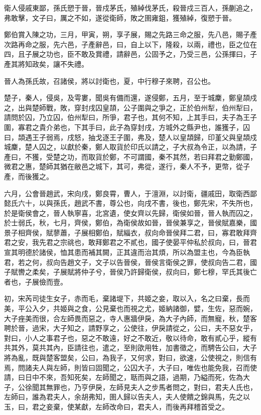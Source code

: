 \begin{pinyinscope}
衛人侵戚東鄙，孫氏愬于晉，晉戍茅氏，殖綽伐茅氏，殺晉戍三百人，孫蒯追之，弗敢擊，文子曰，厲之不如，遂從衛師，敗之圉雍鉏，獲殖綽，復愬于晉。

鄭伯賞入陳之功，三月，甲寅，朔，享子展，賜之先路三命之服，先八邑，賜子產次路再命之服，先六邑，子產辭邑，曰，自上以下，隆殺，以兩，禮也，臣之位在四，且子展之功也，臣不敢及賞禮，請辭邑，公固予之，乃受三邑，公孫揮曰，子產其將知政矣，讓不失禮。

晉人為孫氏故，召諸侯，將以討衛也，夏，中行穆子來聘，召公也。

楚子，秦人，侵吳，及雩婁，聞吳有備而還，遂侵鄭，五月，至于城麇，鄭皇頡戍之，出與楚師戰，敗，穿封戌囚皇頡，公子圍與之爭之，正於伯州犁，伯州犁曰，請問於囚，乃立囚，伯州犁曰，所爭，君子也，其何不知，上其手曰，夫子為王子圍，寡君之貴介弟也，下其手曰，此子為穿封戌，方城外之縣尹也，誰獲子，囚曰，頡遇王子弱焉，戌怒，抽戈逐王子圍，弗及，楚人以皇頡歸，印堇父與皇頡戍城麇，楚人囚之，以獻於秦，鄭人取貨於印氏以請之，子大叔為令正，以為請，子產曰，不獲，受楚之功，而取貨於鄭，不可謂國，秦不其然，若曰拜君之勤鄭國，微君之惠，楚師其猶在敝邑之城下，其可，弗從，遂行，秦人不予，更幣，從子產，而後獲之。

六月，公會晉趙武，宋向戌，鄭良霄，曹人，于澶淵，以討衛，疆戚田，取衛西鄙懿氏六十，以與孫氏，趙武不書，尊公也，向戌不書，後也，鄭先宋，不失所也，於是衛侯會之，晉人執寧喜，北宮遺，使女齊以先歸，衛侯如晉，晉人執而囚之，於士弱氏，秋，七月，齊侯，鄭伯，為衛侯故如晉，晉侯兼享之，晉侯賦嘉樂，國景子相齊侯，賦蓼蕭，子展相鄭伯，賦緇衣，叔向命晉侯拜二君，曰，寡君敢拜齊君之安，我先君之宗祧也，敢拜鄭君之不貳也，國子使晏平仲私於叔向，曰，晉君宣其明德於諸侯，恤其患而補其闕，正其違而治其煩，所以為盟主也，今為臣執君，若之何，叔向告趙文子，文子以告晉侯，晉侯言衛侯之罪，使叔向告二君，國子賦轡之柔矣，子展賦將仲子兮，晉侯乃許歸衛侯，叔向曰，鄭七穆，罕氏其後亡者也，子展儉而壹。

初，宋芮司徒生女子，赤而毛，棄諸堤下，共姬之妾，取以入，名之曰棄，長而美，平公入夕，共姬與之食，公見棄也而視之尤，姬納諸御，嬖，生佐，惡而婉，大子痤美而很，合左師畏而惡之，寺人惠牆伊戾，為大子內師，而無寵，秋，楚客聘於晉，過宋，大子知之，請野享之，公使往，伊戾請從之，公曰，夫不惡女乎，對曰，小人之事君子也，惡之不敢遠，好之不敢近，敬以待命，敢有貳心乎，縱有共其外，莫共其內，臣請往也，遣之，至則欿用牲，加書徵之，而騁告公曰，大子將為亂，既與楚客盟矣，公曰，為我子，又何求，對曰，欲速，公使視之，則信有焉，問諸夫人與左師，則皆曰固聞之，公囚大子，大子曰，唯佐也能免我，召而使請，曰日中不來，吾知死矣，左師聞之，聒而與之語，過期，乃縊而死，佐為大子，公徐聞其無罪也，乃亨伊戾，左師見夫人之步馬者問之，對曰，君夫人氏也，左師曰，誰為君夫人，余胡弗知，圉人歸以告夫人，夫人使饋之錦與馬，先之以玉，曰，君之妾棄，使某獻，左師改命曰，君夫人，而後再拜稽首受之。


\end{pinyinscope}
